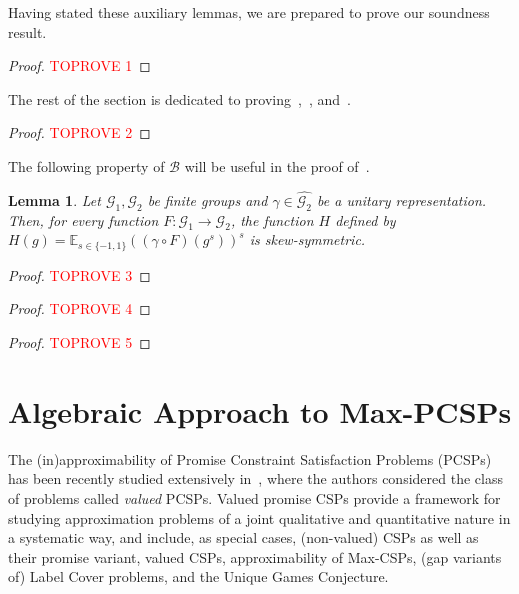\documentclass[a4paper,11pt]{article}
\newtheorem{lemma}[theorem]{Lemma}
\theoremstyle{definition}
\newcommand{\ex}[1]{\mathbb{E}_{#1}}
\newcommand{\gr}{\mathscr{G}}
\newcommand{\B}{\mathcal{B}}
\begin{document}
Having stated these auxiliary lemmas, we are prepared to prove our soundness result. 

\begin{proof}\textcolor{red}{TOPROVE 1}\end{proof}

The rest of the section is dedicated to proving~,~, and~.

\begin{proof}\textcolor{red}{TOPROVE 2}\end{proof}

The following property of $\B$ will be useful in the proof of~.

\begin{lemma} \label{le:EHR-15}
    Let $\gr_1,\gr_2$ be finite groups and $\gamma \in \widehat{\gr_2}$ be a unitary representation. Then, for every function $F:\gr_1 \to \gr_2$, the function $H$ defined by $H(g) = \ex{s\in\{-1,1\}}( (\gamma\circ F)(g^s))^s$ is skew-symmetric. 
\end{lemma}
\begin{proof}\textcolor{red}{TOPROVE 3}\end{proof}


\begin{proof}\textcolor{red}{TOPROVE 4}\end{proof}


\begin{proof}\textcolor{red}{TOPROVE 5}\end{proof}

\section{Algebraic Approach to Max-PCSPs} \label{sec:algebraic-approach}

The (in)approximability of Promise Constraint Satisfaction Problems (PCSPs) has
been recently studied extensively in~\cite{Barto24:lics}, where the authors
considered the class of problems called \emph{valued} PCSPs. 
%
Valued promise CSPs provide a framework for studying approximation problems of a joint
qualitative and quantitative nature in a systematic way, and include, as special
cases, (non-valued) CSPs as well as their promise variant,
valued CSPs, approximability of Max-CSPs, (gap variants of) Label Cover problems, and the Unique Games Conjecture. 
\end{document}
